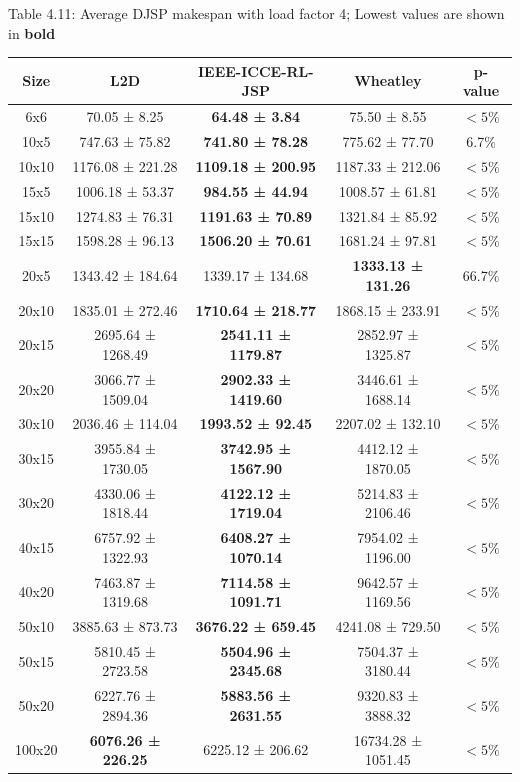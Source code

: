 \begin{table}
    Table 4.11: Average DJSP makespan with load factor 4; Lowest values are shown in \textbf{bold}\\
    \vspace{1mm}
    \label{table:4.8}
    \footnotesize 
    \begin{tabular}{ccccc}
    \toprule
    Size & L2D & IEEE-ICCE-RL-JSP & Wheatley & p-value \\
    \midrule
    6x6 & 70.05 ± 8.25 & \textbf{64.48 ± 3.84} & 75.50 ± 8.55 & $< 5\%$ \\
    10x5 & 747.63 ± 75.82 & \textbf{741.80 ± 78.28} & 775.62 ± 77.70 & 6.7$\%$ \\
    10x10 & 1176.08 ± 221.28 & \textbf{1109.18 ± 200.95} & 1187.33 ± 212.06 & $< 5\%$ \\
    15x5 & 1006.18 ± 53.37 & \textbf{984.55 ± 44.94} & 1008.57 ± 61.81 & $< 5\%$ \\
    15x10 & 1274.83 ± 76.31 & \textbf{1191.63 ± 70.89} & 1321.84 ± 85.92 & $< 5\%$ \\
    15x15 & 1598.28 ± 96.13 & \textbf{1506.20 ± 70.61} & 1681.24 ± 97.81 & $< 5\%$ \\
    20x5 & 1343.42 ± 184.64 & 1339.17 ± 134.68 & \textbf{1333.13 ± 131.26} & 66.7$\%$ \\
    20x10 & 1835.01 ± 272.46 & \textbf{1710.64 ± 218.77} & 1868.15 ± 233.91 & $< 5\%$ \\
    20x15 & 2695.64 ± 1268.49 & \textbf{2541.11 ± 1179.87} & 2852.97 ± 1325.87 & $< 5\%$ \\
    20x20 & 3066.77 ± 1509.04 & \textbf{2902.33 ± 1419.60} & 3446.61 ± 1688.14 & $< 5\%$ \\
    30x10 & 2036.46 ± 114.04 & \textbf{1993.52 ± 92.45} & 2207.02 ± 132.10 & $< 5\%$ \\
    30x15 & 3955.84 ± 1730.05 & \textbf{3742.95 ± 1567.90} & 4412.12 ± 1870.05 & $< 5\%$ \\
    30x20 & 4330.06 ± 1818.44 & \textbf{4122.12 ± 1719.04} & 5214.83 ± 2106.46 & $< 5\%$ \\
    40x15 & 6757.92 ± 1322.93 & \textbf{6408.27 ± 1070.14} & 7954.02 ± 1196.00 & $< 5\%$ \\
    40x20 & 7463.87 ± 1319.68 & \textbf{7114.58 ± 1091.71} & 9642.57 ± 1169.56 & $< 5\%$ \\
    50x10 & 3885.63 ± 873.73 & \textbf{3676.22 ± 659.45} & 4241.08 ± 729.50 & $< 5\%$ \\
    50x15 & 5810.45 ± 2723.58 & \textbf{5504.96 ± 2345.68} & 7504.37 ± 3180.44 & $< 5\%$ \\
    50x20 & 6227.76 ± 2894.36 & \textbf{5883.56 ± 2631.55} & 9320.83 ± 3888.32 & $< 5\%$ \\
    100x20 & \textbf{6076.26 ± 226.25} & 6225.12 ± 206.62 & 16734.28 ± 1051.45 & $< 5\%$ \\
    \bottomrule
    \end{tabular}
\end{table}
    
